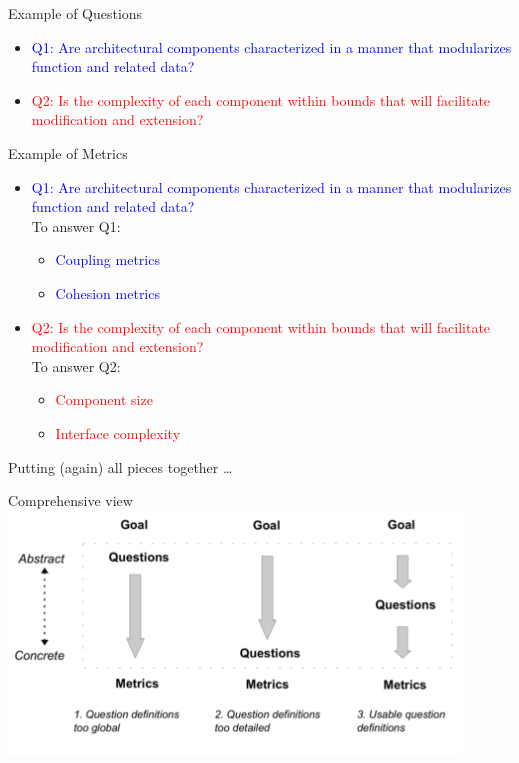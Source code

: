 \documentclass{beamer}
\begin{document}
\begin{frame}
{\centerline{Example of Questions}}

\begin{itemize}
\item \textcolor{blue}{Q1: Are architectural components characterized in a manner that modularizes function and related data?}
\item \textcolor{red}{Q2: Is the complexity of each component within bounds that will facilitate modification and extension?}

\end{itemize}


\end{frame}

\begin{frame}
{\centerline{Example of Metrics}}

\begin{itemize}
\item \textcolor{blue}{Q1: Are architectural components characterized in a manner that modularizes function and related data?}\\
To answer Q1: 
\begin{itemize}
\item \textcolor{blue}{Coupling metrics}
\item \textcolor{blue}{Cohesion metrics}
\end{itemize}

\item \textcolor{red}{Q2: Is the complexity of each component within bounds that will facilitate modification and extension?}\\
To answer Q2:
\begin{itemize}
\item \textcolor{red}{Component size}
\item \textcolor{red}{Interface complexity}
\end{itemize}
\end{itemize}


\end{frame}

\begin{frame}
{\centerline{Putting (again) all pieces together \ldots}}

\begin{center}
\Large Comprehensive view\\
\vspace{0.5cm}
\includegraphics[width=120mm]{A2022.IDSEPC.SperimentazioneDeduzione/ComprehensiveView.png}
\end{center}


\end{frame}
\end{document}
